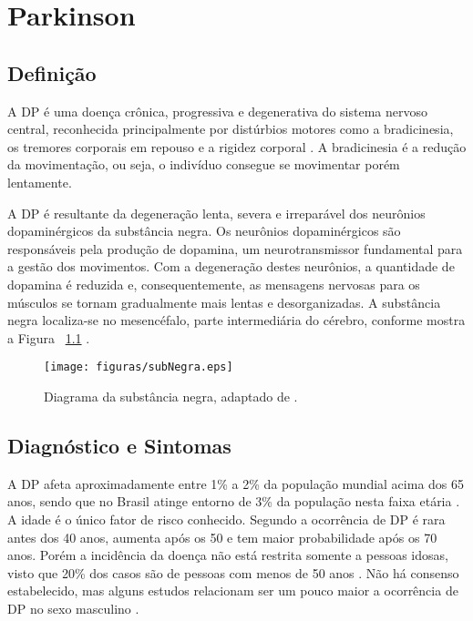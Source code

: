 \chapter{Parkinson}
\section{Definição}

A DP é uma doença crônica, progressiva e degenerativa do sistema nervoso central, reconhecida principalmente por distúrbios motores como a bradicinesia, os tremores corporais em repouso e a rigidez corporal \cite{da2016aspectos}. A bradicinesia é a redução da movimentação, ou seja, o indivíduo consegue se movimentar porém lentamente. 

A DP é resultante da degeneração lenta, severa e irreparável dos neurônios dopaminérgicos da substância negra. Os neurônios dopaminérgicos são responsáveis pela produção de dopamina, um neurotransmissor fundamental para a gestão dos movimentos. Com a degeneração destes neurônios, a quantidade de dopamina é reduzida e, consequentemente, as mensagens nervosas para os músculos se tornam gradualmente mais lentas e desorganizadas. A substância negra localiza-se no mesencéfalo, parte intermediária do cérebro, conforme mostra a Figura ~\ref{substanciaNegra} \cite{eftaxias2015detection}.

\begin{figure}[!htb]
	\centering
	\texttt{[image: figuras/subNegra.eps]}
	\caption{Diagrama da substância negra, adaptado de .}
	\label{substanciaNegra}
\end{figure}

\section{Diagnóstico e Sintomas}
A DP afeta aproximadamente entre 1\% a 2\% da população mundial acima dos 65 anos, sendo que no Brasil atinge entorno de 3\% da população nesta faixa etária \cite{magalhaes2009descobrindo}. A idade é o único fator de risco conhecido. Segundo  a ocorrência de DP é rara antes dos 40 anos, aumenta após os 50 e tem maior probabilidade após os 70 anos. Porém a incidência da doença não está restrita somente a pessoas idosas, visto que 20\% dos casos são de pessoas com menos de 50 anos \cite{gago2014manual}. Não há consenso estabelecido, mas alguns estudos relacionam ser um pouco maior a ocorrência de DP no sexo masculino \cite{peixinho2006alteraccoes}.

